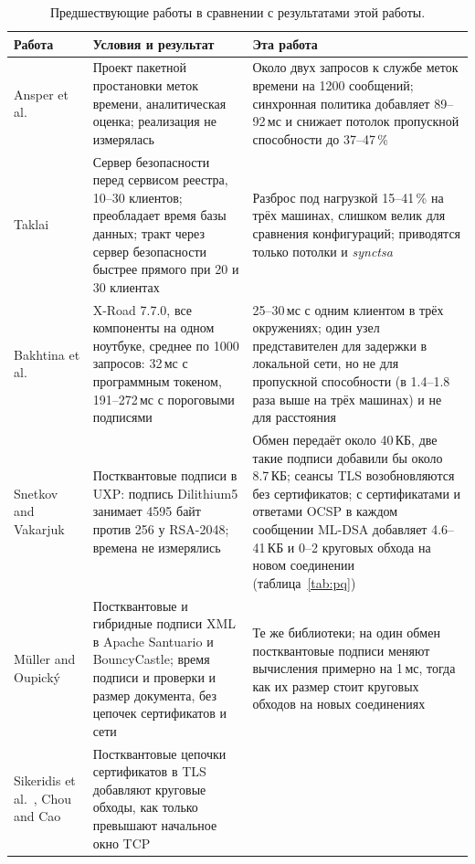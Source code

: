 \documentclass[conference,a4paper]{IEEEtran}
\newcommand{\newtext}[1]{{\color{blue}#1}}
\begin{document}
\begin{table}[!tb]
\centering\small
\caption{Предшествующие работы в сравнении с результатами этой работы.}
\label{tab:related}
\color{blue}
\begin{tabular}{@{}p{}p{}p{}@{}}
\toprule
Работа & Условия и результат & Эта работа \\
\midrule
Ansper et al.~\cite{ansper2013} & Проект пакетной простановки меток времени, аналитическая оценка;
реализация не измерялась & Около двух запросов к службе меток времени на 1200 сообщений;
синхронная политика добавляет 89--92\,мс и снижает потолок пропускной способности до 37--47\,\% \\
\addlinespace
Taklai~\cite{taklai2020} & Сервер безопасности перед сервисом реестра, 10--30 клиентов; преобладает время
базы данных; тракт через сервер безопасности быстрее прямого при 20 и 30
клиентах & Разброс под нагрузкой 15--41\,\% на трёх машинах, слишком велик для сравнения конфигураций;
приводятся только потолки и \emph{synctsa} \\
\addlinespace
Bakhtina et al.~\cite{bakhtina2026ijis} & X-Road 7.7.0, все компоненты на одном ноутбуке, среднее по 1000
запросов: 32\,мс с программным токеном, 191--272\,мс с пороговыми подписями & 25--30\,мс с одним
клиентом в трёх окружениях; один узел представителен для задержки в локальной сети, но не для
пропускной способности (в 1.4--1.8 раза выше на трёх машинах) и не для расстояния \\
\addlinespace
Snetkov and Vakarjuk~\cite{snetkov2023} & Постквантовые подписи в UXP: подпись Dilithium5
занимает 4595 байт против 256 у RSA-2048; времена не измерялись & Обмен передаёт около 40\,КБ, две такие
подписи добавили бы около 8.7\,КБ; сеансы TLS возобновляются без сертификатов; \newtext{с
сертификатами и ответами OCSP в каждом сообщении ML-DSA добавляет 4.6--41\,КБ и 0--2 круговых обхода
на новом соединении (таблица~\ref{tab:pq})} \\
\addlinespace
\newtext{Müller and Oupický~\cite{mueller2024}} & \newtext{Постквантовые и гибридные подписи XML в
Apache Santuario и BouncyCastle; время подписи и проверки и размер документа, без
цепочек сертификатов и сети} & \newtext{Те же библиотеки; на один обмен постквантовые
подписи меняют вычисления примерно на 1\,мс, тогда как их размер стоит круговых обходов на новых
соединениях} \\
\addlinespace
\newtext{Sikeridis et al.~\cite{sikeridis2020}, Chou and Cao~\cite{chou2026}} & \newtext{Постквантовые
цепочки сертификатов в TLS добавляют круговые обходы, как только превышают начальное окно TCP} &

\end{tabular}
\end{table}
\end{document}
